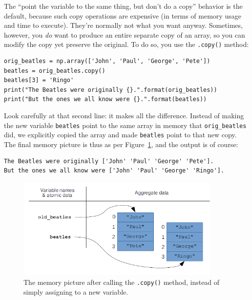 The ``point the variable to the same thing, but don't do a copy'' behavior is
the default, because such copy operations are expensive (in terms of memory
usage and time to execute). They're normally not what you want anyway.
Sometimes, however, you \textit{do} want to produce an entire separate copy of
an array, so you can modify the copy yet preserve the original. To do so, you
use the \texttt{.copy()} method:

\begin{Verbatim}[fontsize=\footnotesize,samepage=true,frame=single,framesep=3mm]
orig_beatles = np.array(['John', 'Paul', 'George', 'Pete'])
beatles = orig_beatles.copy()
beatles[3] = 'Ringo'
print("The Beatles were originally {}.".format(orig_beatles))
print("But the ones we all know were {}.".format(beatles))
\end{Verbatim}

Look carefully at that second line: it makes all the difference. Instead of
making the new variable \texttt{beatles} point to the same array in memory that
\texttt{orig\_beatles} did, we explicitly copied the array and made
\texttt{beatles} point to that new copy. The final memory picture is thus as
per Figure~\ref{fig:copyNotRef}, and the output is of course:

\begin{Verbatim}[fontsize=\footnotesize,samepage=true,frame=leftline,framesep=5mm,framerule=1mm]
The Beatles were originally ['John' 'Paul' 'George' 'Pete'].
But the ones we all know were ['John' 'Paul' 'George' 'Ringo'].
\end{Verbatim}

\begin{figure}[ht]
\centering
\includegraphics[width=0.9\textwidth]{copyNotRef.png}
\caption{The memory picture after calling the \texttt{.copy()} method, instead
of simply assigning to a new variable.}
\label{fig:copyNotRef}
\end{figure}


